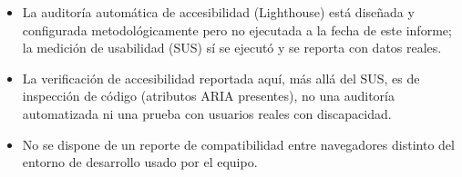 \begin{itemize}[nosep]
  \item La auditor\'ia autom\'atica de accesibilidad (Lighthouse) est\'a
    dise\~nada y configurada metodol\'ogicamente pero no ejecutada a la
    fecha de este informe; la medici\'on de usabilidad (SUS) s\'i se
    ejecut\'o y se reporta con datos reales.
  \item La verificaci\'on de accesibilidad reportada aqu\'i, m\'as all\'a
    del SUS, es de inspecci\'on de c\'odigo (atributos ARIA presentes), no
    una auditor\'ia automatizada ni una prueba con usuarios reales con
    discapacidad.
  \item No se dispone de un reporte de compatibilidad entre navegadores
    distinto del entorno de desarrollo usado por el equipo.
\end{itemize}
